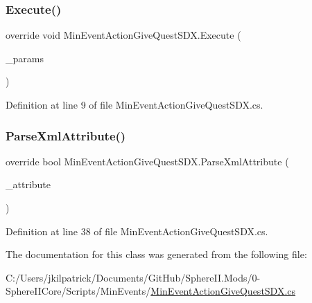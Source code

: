 \subsubsection{\texorpdfstring{Execute()}{Execute()}}
{\footnotesize\ttfamily override void Min\+Event\+Action\+Give\+Quest\+S\+D\+X.\+Execute (\begin{DoxyParamCaption}\item[{Min\+Event\+Params}]{\+\_\+params }\end{DoxyParamCaption})}



Definition at line 9 of file Min\+Event\+Action\+Give\+Quest\+S\+D\+X.\+cs.

\mbox{\label{class_min_event_action_give_quest_s_d_x_a38e21e977df460d768128b065dd90c7b}} 
\subsubsection{\texorpdfstring{ParseXmlAttribute()}{ParseXmlAttribute()}}
{\footnotesize\ttfamily override bool Min\+Event\+Action\+Give\+Quest\+S\+D\+X.\+Parse\+Xml\+Attribute (\begin{DoxyParamCaption}\item[{Xml\+Attribute}]{\+\_\+attribute }\end{DoxyParamCaption})}



Definition at line 38 of file Min\+Event\+Action\+Give\+Quest\+S\+D\+X.\+cs.



The documentation for this class was generated from the following file\+:\begin{DoxyCompactItemize}
\item 
C\+:/\+Users/jkilpatrick/\+Documents/\+Git\+Hub/\+Sphere\+I\+I.\+Mods/0-\/\+Sphere\+I\+I\+Core/\+Scripts/\+Min\+Events/\mbox{\hyperlink{_min_event_action_give_quest_s_d_x_8cs}{Min\+Event\+Action\+Give\+Quest\+S\+D\+X.\+cs}}\end{DoxyCompactItemize}
